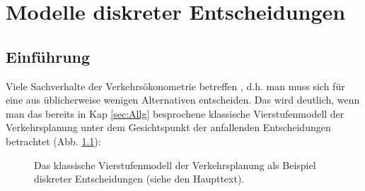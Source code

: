 
\newcommand{\beispiel}[1]{
 \vspace{0.7em}
 \noindent
 \textit{#1:}
 \vspace{-0.2em}

 \noindent
}

\providecommand{\tilV}{\tilde{V}}


\chapter{\label{sec:choice}Modelle diskreter Entscheidungen}

\section{\label{sec:DiscrEinf}Einf\"uhrung}

Viele Sachverhalte der Verkehrs\"okonometrie betreffen
, d.h. man muss sich f\"ur eine aus
\"ublicherweise wenigen Alternativen entscheiden. Das wird deutlich,
wenn man das bereits in Kap \ref{sec:Allg} besprochene
 klassische Vierstufenmodell der Verkehrsplanung
unter dem Gesichtspunkt der anfallenden
 Entscheidungen betrachtet (Abb. \ref{fig:vierstufenmodellDiscr}):

\begin{figure}[h!]
\caption{\label{fig:vierstufenmodellDiscr}Das klassische Vierstufenmodell
der Verkehrsplanung als Beispiel diskreter Entscheidungen (siehe den Haupttext).
}
\end{figure}

